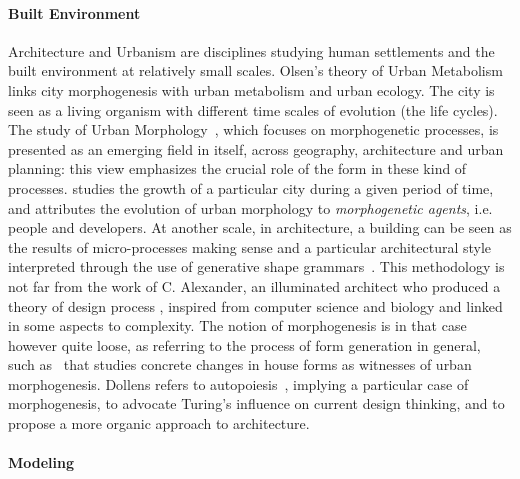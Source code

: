 \paragraph{Built Environment}

Architecture and Urbanism are disciplines studying human settlements and the built environment at relatively small scales. Olsen's theory of Urban Metabolism \cite{olsen1982urban} links city morphogenesis with urban metabolism and urban ecology. The city is seen as a living organism with different time scales of evolution (the life cycles). The study of Urban Morphology~\cite{moudon1997urban}, which focuses on morphogenetic processes, is presented as an emerging field in itself, across geography, architecture and urban planning: this view emphasizes the crucial role of the form in these kind of processes. \cite{burke1972dublin} studies the growth of a particular city during a given period of time, and attributes the evolution of urban morphology to \emph{morphogenetic agents}, i.e. people and developers. At another scale, in architecture, a building can be seen as the results of micro-processes making sense and a particular architectural style interpreted through the use of generative shape grammars~\cite{ceccarini2001essai}. This methodology is not far from the work of C. Alexander, an illuminated architect who produced a theory of design process \cite{mehaffy2007notes}, inspired from computer science and biology and linked in some aspects to complexity. The notion of morphogenesis is in that case however quite loose, as referring to the process of form generation in general, such as~\cite{whitehand1999urban} that studies concrete changes in house forms as witnesses of urban morphogenesis. Dollens refers to autopoiesis~\cite{dollens2014alan}, implying a particular case of morphogenesis, to advocate Turing's influence on current design thinking, and to propose a more organic approach to architecture.

\cite{desmarais1992premisses}
\cite{levy2005formes}




\paragraph{Modeling}

